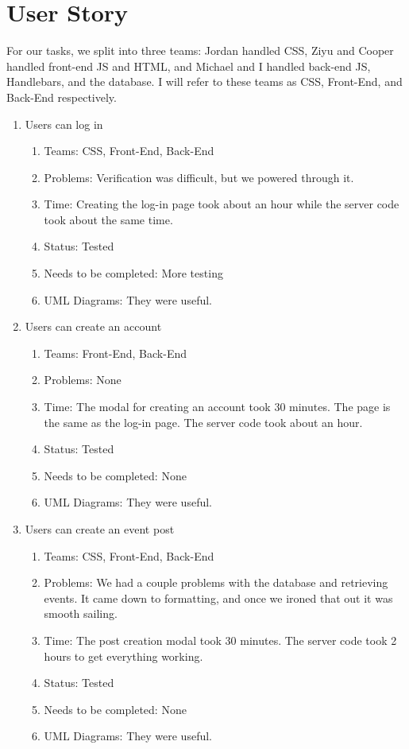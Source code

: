 \documentclass[a4paper]{article}
\begin{document}
\section{User Story}
For our tasks, we split into three teams: Jordan handled CSS, Ziyu and Cooper handled front-end JS and HTML, and Michael and I handled back-end JS, Handlebars, and the database. I will refer to these teams as CSS, Front-End, and Back-End respectively.
\begin{enumerate}

\item Users can log in
\begin{enumerate}
\item Teams: CSS, Front-End, Back-End
\item Problems: Verification was difficult, but we powered through it.
\item Time: Creating the log-in page took about an hour while the server code took about the same time.
\item Status: Tested
\item Needs to be completed: More testing
\item UML Diagrams: They were useful.
\end{enumerate}

\item Users can create an account
\begin{enumerate}
\item Teams: Front-End, Back-End
\item Problems: None
\item Time: The modal for creating an account took 30 minutes. The page is the same as the log-in page. The server code took about an hour.
\item Status: Tested
\item Needs to be completed: None
\item UML Diagrams: They were useful.
\end{enumerate}

\item Users can create an event post
\begin{enumerate}
\item Teams: CSS, Front-End, Back-End
\item Problems: We had a couple problems with the database and retrieving events. It came down to formatting, and once we ironed that out it was smooth sailing.
\item Time: The post creation modal took 30 minutes. The server code took 2 hours to get everything working.
\item Status: Tested
\item Needs to be completed: None
\item UML Diagrams: They were useful.
\end{enumerate}


\end{enumerate}
\end{document}
